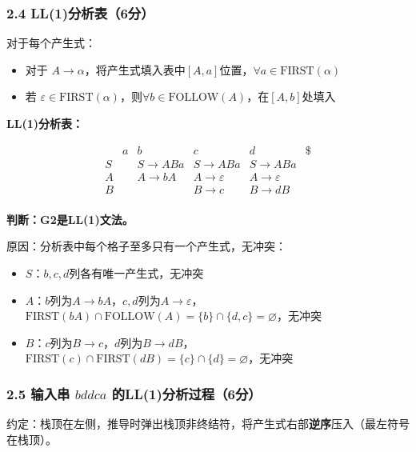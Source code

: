 \documentclass[12pt,a4paper,fontset=fandol]{ctexart}
\begin{document}
\subsubsection*{2.4 LL(1)分析表（6分）}

对于每个产生式：
\begin{itemize}
    \item 对于 $A \to \alpha$，将产生式填入表中$[A, a]$位置，$\forall a \in \text{FIRST}(\alpha)$
    \item 若 $\varepsilon \in \text{FIRST}(\alpha)$，则$\forall b \in \text{FOLLOW}(A)$，在$[A, b]$处填入
\end{itemize}

\textbf{LL(1)分析表：}

\[
\begin{array}{c|ccccc}
     & a & b & c & d & \$ \\
\hline
S &   & S \to ABa & S \to ABa & S \to ABa &   \\
A &   & A \to bA  & A \to \varepsilon & A \to \varepsilon &   \\
B &   &     & B \to c   & B \to dB  &   \\
\end{array}
\]

\textbf{判断：G2是LL(1)文法。}

原因：分析表中每个格子至多只有一个产生式，无冲突：
\begin{itemize}
    \item $S$：$b, c, d$列各有唯一产生式，无冲突
    \item $A$：$b$列为$A \to bA$，$c, d$列为$A \to \varepsilon$，$\text{FIRST}(bA) \cap \text{FOLLOW}(A) = \{b\} \cap \{d,c\} = \varnothing$，无冲突
    \item $B$：$c$列为$B \to c$，$d$列为$B \to dB$，$\text{FIRST}(c) \cap \text{FIRST}(dB) = \{c\} \cap \{d\} = \varnothing$，无冲突
\end{itemize}

\subsubsection*{2.5 输入串 $bddca$ 的LL(1)分析过程（6分）}

约定：栈顶在左侧，推导时弹出栈顶非终结符，将产生式右部\textbf{逆序}压入（最左符号在栈顶）。
\end{document}
